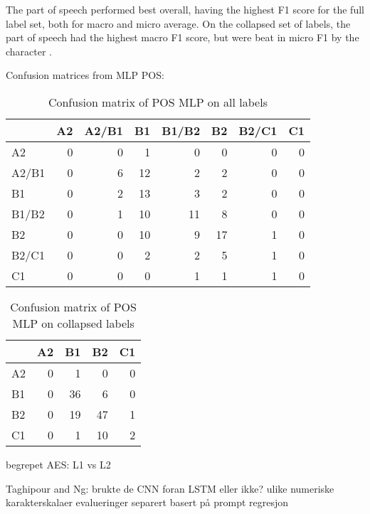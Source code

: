 The part of speech \ngrams performed best overall, having the highest F1 score
for the full label set, both for macro and micro average. On the collapsed set
of labels, the part of speech \ngrams had the highest macro F1 score, but were
beat in micro F1 by the character \ngrams.

Confusion matrices from MLP POS:

\begin{table}
  \centering
  \begin{tabular}{|l|rrrrrrr|}
    \toprule
          & A2 & A2/B1 & B1 & B1/B2 & B2 & B2/C1 & C1 \\
    \midrule
    A2    &  0 &     0 &  1 &     0 &  0 &     0 &  0 \\
    A2/B1 &  0 &     6 & 12 &     2 &  2 &     0 &  0 \\
    B1    &  0 &     2 & 13 &     3 &  2 &     0 &  0 \\
    B1/B2 &  0 &     1 & 10 &    11 &  8 &     0 &  0 \\
    B2    &  0 &     0 & 10 &     9 & 17 &     1 &  0 \\
    B2/C1 &  0 &     0 &  2 &     2 &  5 &     1 &  0 \\
    C1    &  0 &     0 &  0 &     1 &  1 &     1 &  0 \\
    \bottomrule
  \end{tabular}
  \caption{Confusion matrix of POS MLP on all labels}
  \label{confusion-full}
\end{table}

\begin{table}
  \centering
  \begin{tabular}{|l|rrrr|}
    \toprule
       & A2 & B1 & B2 & C1 \\
    \midrule
    A2 &  0 &  1 &  0 &  0 \\
    B1 &  0 & 36 &  6 &  0 \\
    B2 &  0 & 19 & 47 &  1 \\
    C1 &  0 &  1 & 10 &  2 \\
    \bottomrule
  \end{tabular}
  \caption{Confusion matrix of POS MLP on collapsed labels}
  \label{confusion-collapsed}
\end{table}

begrepet AES: L1 vs L2

Taghipour and Ng:
brukte de CNN foran LSTM eller ikke?
ulike numeriske karakterskalaer
evalueringer separert basert på prompt
regresjon
